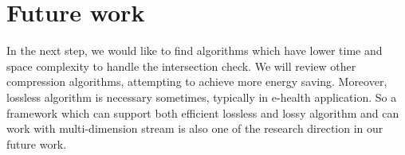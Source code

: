 \section{Future work}

In the next step, we would like to  find algorithms which have lower time and
space complexity to handle the intersection check. We will review other
compression algorithms, attempting to achieve more energy saving.  Moreover,
lossless algorithm is necessary sometimes, typically in e-health application. So
a framework which can support both efficient lossless and lossy algorithm and
can work with multi-dimension stream is also one of the research
direction in our future work.
